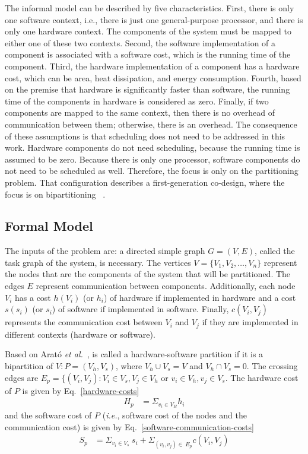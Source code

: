 The informal model can be described by five characteristics. First, there is only one software context, i.e., there is just one general-purpose processor, and there is only one hardware context. The components of the system must be mapped to either one of these two contexts. Second, the software implementation of a component is associated with a software cost, which is the running time of the component. Third, the hardware implementation of a component has a hardware cost, which can be area, heat dissipation, and energy consumption. Fourth, based on the premise that hardware is significantly faster than software, the running time of the components in hardware is considered as zero. Finally, if two components are mapped to the same context, then there is no overhead of communication between them; otherwise, there is an overhead. The consequence of these assumptions is that scheduling does not need to be addressed in this work. Hardware components do not need scheduling, because the running time is assumed to be zero. Because there is only one processor, software components do not need to be scheduled as well. Therefore, the focus is only on the partitioning problem. That configuration describes a first-generation co-design, where the focus is on bipartitioning ~\cite{Teich2012}.

\subsection{Formal Model}
\label{Formal-Model}

The inputs of the problem are: a directed simple graph $ G = (V,E) $, called the task graph of the system, is necessary. The vertices $V = \{V_1,V_2,\dotso,V_n\}$ represent the nodes that are the components of the system that will be partitioned. The edges $E$ represent communication between components. Additionally, each node  $V_i$ has a cost $h(V_i)$ (or $h_i$) of hardware if implemented in hardware and a cost $s(s_i)$ (or $ s_i $) of software if implemented in software. Finally, $c(V_i,V_j)$ represents the communication cost between $V_i$ and $V_j$ if they are implemented in different contexts (hardware or software).

Based on Arat\'o {\it et al.}~\cite{Arato2003}, is called a hardware-software partition if it is a bipartition of $V:P = (V_h, V_s)$, where $V_h \cup V_s = V$  and $V_h \cap V_s = 0$. The crossing edges are $E_p = \{(V_i,V_j):V_i \in V_s, V_j \in V_h$ or $v_i \in V_h, v_j \in V_s $. The hardware cost of $P$ is given by Eq.~\ref{hardware-costs}
%
\begin{align}
\label{hardware-costs}
H_p  &= \Sigma_{v_i \in V_H} h_i
\end{align}
%
\noindent and the software cost of $P$ ({\it i.e.}, software cost of the nodes and the communication cost) is given by Eq.~\ref{software-communication-costs}
%
\begin{align}
\label{software-communication-costs}
  S_p &= \Sigma_{v_i \in V_s}\:s_i + \Sigma_{(v_i,v_j)\in\:E_p} c(V_i,V_j)
\end{align}


